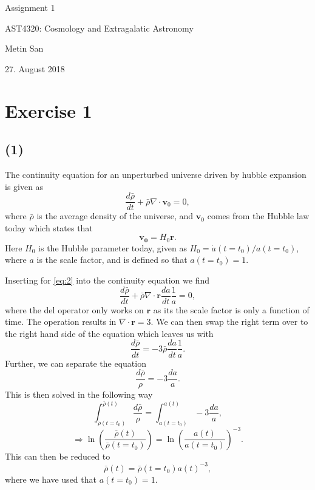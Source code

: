 \documentclass[a4paper]{article}
\begin{document}
\vspace*{2cm}
\begin{center} 
 
\huge{Assignment 1}

\vspace{15mm}

\large{AST4320: Cosmology and Extragalatic Astronomy}

\vspace{5mm}

\normalsize{Metin San}

\vspace{5mm}

\normalsize{27. August 2018}

\vspace{25mm}

\end{center}

\newpage
\section*{Exercise 1}
\subsection*{(1)}

The continuity equation for an unperturbed universe driven by hubble expansion is given as 
\begin{equation}\label{eq:1}
\frac{d\bar{\rho}}{dt} + \bar{\rho} \nabla \cdot \mathbf{v}_0 = 0,
\end{equation}
where $\bar{\rho}$ is the average density of the universe, and $\mathbf{v}_0$ comes from the Hubble law today which states that 
\begin{equation}\label{eq:2}
\mathbf{v_0} = H_0 \mathbf{r}.
\end{equation}
Here $H_0$ is the Hubble parameter today, given as $H_0 = \dot{a}(t=t_0) / a(t = t_0)$, where $a$ is the scale factor, and is defined so that $a(t= t_0) = 1$. 

Inserting for \eqref{eq:2} into the continuity equation we find
\[
\frac{d\bar{\rho}}{dt} + \bar{\rho} \nabla \cdot \mathbf{r}  \frac{da}{dt} \frac{1}{a}= 0,
\]
where the del operator only works on $\mathbf{r}$ as its the scale factor is only a function of time. The operation results in $\nabla \cdot \mathbf{r} = 3$. We can then swap the right term over to the right hand side of the equation which leaves us with
\[
\frac{d\bar{\rho}}{dt}  = - 3\bar{\rho}\frac{da}{dt} \frac{1}{a}.
\]
Further, we can separate the equation
\[
\frac{d\bar{\rho}}{\rho} = -3 \frac{da}{a}.
\]
This is then solved in the following way
\[
\int_{\bar{\rho}(t=t_0)}^{\bar{\rho}(t)} \frac{d\bar{\rho}}{\rho} = \int_{a(t=t_0)}^{a(t)} -3 \frac{da}{a},
\]
\[
\Rightarrow \ln \left( \frac{\bar{\rho}(t)}{\bar{\rho}(t=t_0)}\right) = \ln \left( \frac{a(t)}{a(t=t_0)}\right)^{-3}.
\]
This can then be reduced to
\begin{equation}\label{eq:3}
\bar{\rho}(t) = \bar{\rho}(t=t_0)a(t)^{-3},
\end{equation}
where we have used that $a(t=t_0) = 1$.
\end{document}
